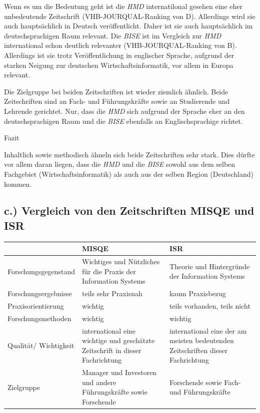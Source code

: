 \documentclass[12pt,utf8]{scrartcl}
\begin{document}
\begin{flushleft}
Wenn es um die Bedeutung geht ist die \emph{HMD} internatilonal gesehen eine eher unbedeutende Zeitschrift (VHB-JOURQUAL-Ranking von D)\cite{VHBJ}. Allerdings wird sie auch hauptsächlich in Deutsch veröffentlicht. Daher ist sie auch hauptsächlich im deutschsprachigen Raum relevant. 
Die \emph{BISE} ist im Vergleich zur \emph{HMD} international schon deutlich relevanter (VHB-JOURQUAL-Ranking von B)\cite{VHBJ}. Allerdings ist sie trotz Veröffentlichung in englischer Sprache, aufgrund der starken Neigung zur deutschen Wirtschaftsinformatik, vor allem in Europa relevant. 

Die Zielgruppe bei beiden Zeitschriften ist wieder ziemlich ähnlich. Beide Zeitschriften sind an Fach- und Führungskräfte sowie an Studierende und Lehrende gerichtet. Nur, dass die \emph{HMD} sich aufgrund der Sprache eher an den deutschsprachigen Raum und die \emph{BISE} ebenfalls an Englischsprachige richtet.
\newline

{\Large Fazit}

Inhaltlich sowie methodisch ähneln sich beide Zeitschriften sehr stark. Dies dürfte vor allem daran liegen, dass die \emph{HMD} und die \emph{BISE} sowohl aus dem selben Fachgebiet (Wirtschaftsinformatik) als auch aus der selben Region (Deutschland) kommen.
\subsection{\label{sub3:einfuehrung}c.) Vergleich von den Zeitschriften MISQE und ISR}

\begin{tabular}{|p{4cm}|p{5.5cm}|p{5.5cm}|}
\hline
& MISQE & ISR \\
\hline
Forschungsgegenstand & Wichtiges und Nützliches für die Praxis der Information Systems & Theorie und Hintergründe der Information Systems \\
\hline
Forschungsergebnisse & teils sehr Praxisnah & kaum Praxisbezug \\
\hline
Praxisorientierung & wichtig & teils vorhanden, teils nicht \\
\hline
Forschungsmethoden & wichtig & wichtig \\
\hline
Qualität/ Wichtigkeit & international eine wichtige und geschätzte Zeitschrift in dieser Fachrichtung & international eine der am meisten bedeutenden Zeitschriften dieser Fachrichtung \\
\hline
Zielgruppe & Manager und Investoren und andere Führungskräfte sowie Forschende & Forschende sowie Fach- und Führungskräfte \\
\hline
\end{tabular}
\newline
\newline
\newline


\end{flushleft}
\end{document}
